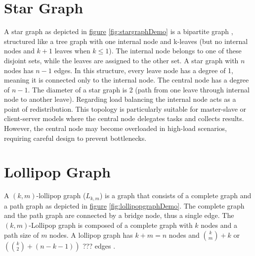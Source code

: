 \section{Star Graph}\label{sec:2stargraph}
A star graph as depicted in \hyperref[fig:stargraphDemo]{figure} \ref{fig:stargraphDemo} is a bipartite graph \cite{west2001introduction}, structured like a tree graph with one internal node and k-leaves (but no internal nodes and $k + 1$ leaves when $k \leq 1$). The internal node belongs to one of these disjoint sets, while the leaves are assigned to the other set. A star graph with $n$ nodes has $n-1$ edges. In this structure, every leave node has a degree of 1, meaning it is connected only to the internal node. The central node has a degree of $n-1$. The diameter of a star graph is 2 (path from one leave through internal node to another leave). Regarding load balancing the internal node acts as a point of redistribution. This topology is particularly suitable for master-slave or client-server models where the central node delegates tasks and collects results. However, the central node may become overloaded in high-load scenarios, requiring careful design to prevent bottlenecks.

%     
% 

\section{Lollipop Graph}\label{sec:2lollipopgraph}
A $(k, m)$-lollipop graph ($L_{k,m}$) is a graph that consists of a complete graph and a path graph as depicted in \hyperref[fig:lollipopgraphDemo]{figure} \ref{fig:lollipopgraphDemo}. The complete graph and the path graph are connected by a bridge node, thus a single edge. The $(k, m)$-Lollipop graph is composed of a complete graph with $k$ nodes and a path size of $m$ nodes. A lollipop graph has $k+m = n$ nodes and $\binom{k}{m}+k$ or $(\binom{k}{2} + (n-k-1))$ ??? edges \cite{JonassonLollipopGraphs2000}.


